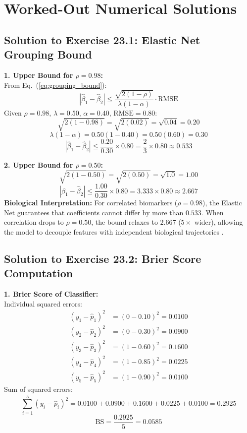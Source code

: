 \documentclass[11pt,oneside]{book}
\begin{document}
\clearpage

\section{Worked-Out Numerical Solutions}

\subsection*{Solution to Exercise 23.1: Elastic Net Grouping Bound}

\textbf{1. Upper Bound for $\rho = 0.98$:}\\
From Eq.~(\ref{eq:grouping_bound}):
$$|\hat{\beta}_1 - \hat{\beta}_2| \le \frac{\sqrt{2(1 - \rho)}}{\lambda(1 - \alpha)} \cdot \text{RMSE}$$
Given $\rho = 0.98$, $\lambda = 0.50$, $\alpha = 0.40$, $\text{RMSE} = 0.80$:
$$\sqrt{2(1 - 0.98)} = \sqrt{2(0.02)} = \sqrt{0.04} = 0.20$$
$$\lambda(1 - \alpha) = 0.50(1 - 0.40) = 0.50(0.60) = 0.30$$
$$|\hat{\beta}_1 - \hat{\beta}_2| \le \frac{0.20}{0.30} \times 0.80 = \frac{2}{3} \times 0.80 \approx 0.533$$

\textbf{2. Upper Bound for $\rho = 0.50$:}\\
$$\sqrt{2(1 - 0.50)} = \sqrt{2(0.50)} = \sqrt{1.0} = 1.00$$
$$|\hat{\beta}_1 - \hat{\beta}_2| \le \frac{1.00}{0.30} \times 0.80 = 3.333 \times 0.80 \approx 2.667$$
\textbf{Biological Interpretation:} For correlated biomarkers ($\rho = 0.98$), the Elastic Net guarantees that coefficients cannot differ by more than $0.533$. When correlation drops to $\rho = 0.50$, the bound relaxes to $2.667$ ($5\times$ wider), allowing the model to decouple features with independent biological trajectories \cite{zou2005regularization}.

\subsection*{Solution to Exercise 23.2: Brier Score Computation}

\textbf{1. Brier Score of Classifier:}\\
Individual squared errors:
\begin{align*}
(y_1 - \hat{p}_1)^2 &= (0 - 0.10)^2 = 0.0100 \\
(y_2 - \hat{p}_2)^2 &= (0 - 0.30)^2 = 0.0900 \\
(y_3 - \hat{p}_3)^2 &= (1 - 0.60)^2 = 0.1600 \\
(y_4 - \hat{p}_4)^2 &= (1 - 0.85)^2 = 0.0225 \\
(y_5 - \hat{p}_5)^2 &= (1 - 0.90)^2 = 0.0100
\end{align*}
Sum of squared errors:
$$\sum_{i=1}^5 (y_i - \hat{p}_i)^2 = 0.0100 + 0.0900 + 0.1600 + 0.0225 + 0.0100 = 0.2925$$
$$\text{BS} = \frac{0.2925}{5} = 0.0585$$
\end{document}
